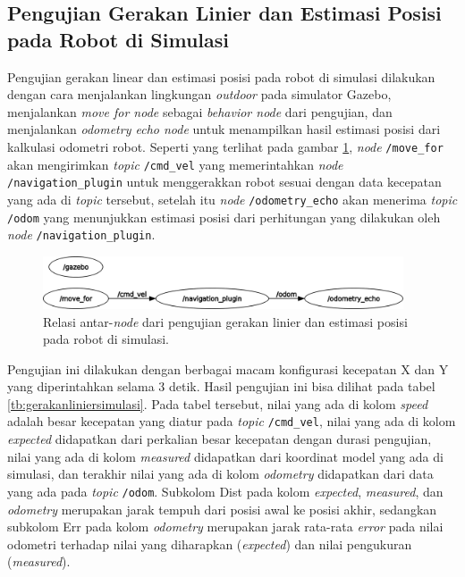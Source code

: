 \subsection{Pengujian Gerakan Linier dan Estimasi Posisi pada Robot di Simulasi}
\label{subsec:liniersimulasi}

Pengujian gerakan linear dan estimasi posisi pada robot di simulasi dilakukan dengan cara menjalankan lingkungan \emph{outdoor} pada simulator Gazebo,
  menjalankan \emph{move for node} sebagai \emph{behavior node} dari pengujian,
  dan menjalankan \emph{odometry echo node} untuk menampilkan hasil estimasi posisi dari kalkulasi odometri robot.
Seperti yang terlihat pada gambar \ref{fig:rosgraphnavigationplugin},
  \emph{node} \lstinline{/move_for} akan mengirimkan \emph{topic} \lstinline{/cmd_vel} yang memerintahkan \emph{node} \lstinline{/navigation_plugin} untuk menggerakkan robot sesuai dengan data kecepatan yang ada di \emph{topic} tersebut,
  setelah itu \emph{node} \lstinline{/odometry_echo} akan menerima \emph{topic} \lstinline{/odom} yang menunjukkan estimasi posisi dari perhitungan yang dilakukan oleh \emph{node} \lstinline{/navigation_plugin}.

\begin{figure}[ht]
  \centering
  \includegraphics[width=0.95\textwidth,keepaspectratio]{gambar/rosgraph-navigation-plugin.png}
  \caption{Relasi antar-\emph{node} dari pengujian gerakan linier dan estimasi posisi pada robot di simulasi.}
  \label{fig:rosgraphnavigationplugin}
\end{figure}



Pengujian ini dilakukan dengan berbagai macam konfigurasi kecepatan X dan Y yang diperintahkan selama 3 detik.
Hasil pengujian ini bisa dilihat pada tabel \ref{tb:gerakanliniersimulasi}.
Pada tabel tersebut, nilai yang ada di kolom \emph{speed} adalah besar kecepatan yang diatur pada \emph{topic} \lstinline{/cmd_vel},
  nilai yang ada di kolom \emph{expected} didapatkan dari perkalian besar kecepatan dengan durasi pengujian,
  nilai yang ada di kolom \emph{measured} didapatkan dari koordinat model yang ada di simulasi,
  dan terakhir nilai yang ada di kolom \emph{odometry} didapatkan dari data yang ada pada \emph{topic} \lstinline{/odom}.
Subkolom Dist pada kolom \emph{expected}, \emph{measured}, dan \emph{odometry} merupakan jarak tempuh dari posisi awal ke posisi akhir,
  sedangkan subkolom Err pada kolom \emph{odometry} merupakan jarak rata-rata \emph{error} pada nilai odometri terhadap nilai yang diharapkan (\emph{expected}) dan nilai pengukuran (\emph{measured}).

